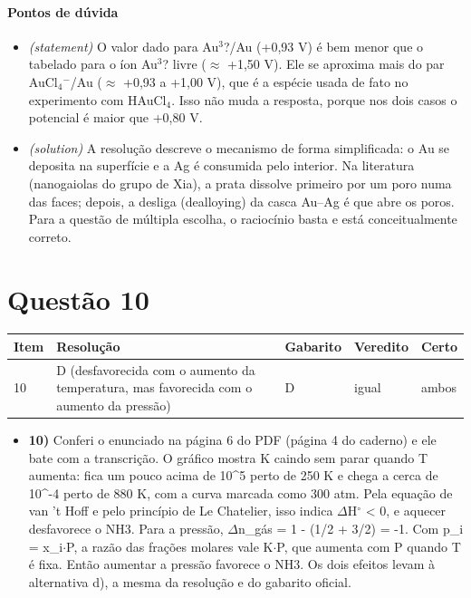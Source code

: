 \documentclass{article}%
\begin{document}
\paragraph{Pontos de dúvida}%
\begin{itemize}%
\item%
\textit{(statement)} O valor dado para Au$^3$?/Au (+0,93 V) é bem menor que o tabelado para o íon Au$^3$? livre ($\approx$ +1,50 V). Ele se aproxima mais do par AuCl$_{4}$$^{-}$/Au ($\approx$ +0,93 a +1,00 V), que é a espécie usada de fato no experimento com HAuCl$_{4}$. Isso não muda a resposta, porque nos dois casos o potencial é maior que +0,80 V.%
\item%
\textit{(solution)} A resolução descreve o mecanismo de forma simplificada: o Au se deposita na superfície e a Ag é consumida pelo interior. Na literatura (nanogaiolas do grupo de Xia), a prata dissolve primeiro por um poro numa das faces; depois, a desliga (dealloying) da casca Au--Ag é que abre os poros. Para a questão de múltipla escolha, o raciocínio basta e está conceitualmente correto.%
\end{itemize}%
\section*{Questão 10}%
\begin{longtable}{@{}p{} p{} p{} p{} p{}@{}}\toprule Item & Resolução & Gabarito & Veredito & Certo \\ \midrule
10 & D (desfavorecida com o aumento da temperatura, mas favorecida com o aumento da pressão) & D & igual & ambos \\
\bottomrule\end{longtable}%
\begin{itemize}%
\item%
\textbf{10)} Conferi o enunciado na página 6 do PDF (página 4 do caderno) e ele bate com a transcrição. O gráfico mostra K caindo sem parar quando T aumenta: fica um pouco acima de 10\^{}5 perto de 250 K e chega a cerca de 10\^{}{-}4 perto de 880 K, com a curva marcada como 300 atm. Pela equação de van 't Hoff e pelo princípio de Le Chatelier, isso indica $\Delta$H$^\circ$ < 0, e aquecer desfavorece o NH3. Para a pressão, $\Delta$n\_gás = 1 - (1/2 + 3/2) = -1. Com p\_i = x\_i$\cdot$P, a razão das frações molares vale K$\cdot$P, que aumenta com P quando T é fixa. Então aumentar a pressão favorece o NH3. Os dois efeitos levam à alternativa d), a mesma da resolução e do gabarito oficial.%
\end{itemize}%
\end{document}
